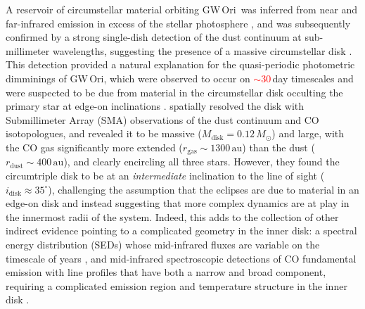 \documentclass[twocolumn]{aastex61}
\newcommand{\todo}[1]{ \textcolor{red}{#1}}
\newcommand{\gw}{GW\,Ori}
\begin{document}
A reservoir of circumstellar material orbiting \gw\ was inferred from near and far-infrared emission in excess of the stellar photosphere \citep{mathieu91}, and was subsequently confirmed by a strong single-dish detection of the dust continuum at sub-millimeter wavelengths, suggesting the presence of a massive circumstellar disk \citep[$M_\mathrm{disk} \gtrsim 0.1\,M_\odot$;][]{mathieu95}. This detection provided a natural explanation for the  quasi-periodic photometric dimminings of \gw, which were observed to occur on \todo{$\sim$30\,}day timescales and were suspected to be due from material in the circumstellar disk occulting the primary star at edge-on inclinations \citep[$i_\mathrm{disk} \approx 90^\circ$;][]{shevchenko92,shevchenko98}.
\citet{fang17} spatially resolved the disk with Submillimeter Array (SMA) observations of the dust continuum and CO isotopologues, and revealed it to be massive ($M_\mathrm{disk} = 0.12\,M_\odot$) and large, with the CO gas significantly more extended ($r_\mathrm{gas} \sim 1300\,\mathrm{au}$) than the dust ($r_\mathrm{dust} \sim 400\,\mathrm{au}$), and clearly encircling all three stars. However, they found the circumtriple disk to be at an \emph{intermediate} inclination to the line of sight ($i_\mathrm{disk} \approx 35^\circ$), challenging the assumption that the eclipses are due to material in an edge-on disk and instead suggesting that more complex dynamics are at play in the innermost radii of the system.
Indeed, this adds to the collection of other indirect evidence pointing to a complicated geometry in the inner disk: a spectral energy distribution (SEDs) whose mid-infrared fluxes are variable on the timescale of years \citep{fang14}, and mid-infrared spectroscopic detections of CO fundamental emission with line profiles that have both a narrow and broad component, requiring a complicated emission region and temperature structure in the inner disk \citep{najita03}.
\end{document}
